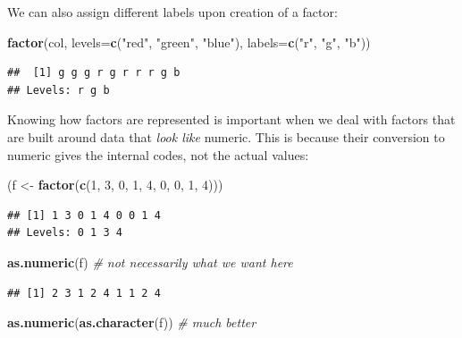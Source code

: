 \documentclass[10pt,b5paper,krantz1]{krantz}
\newenvironment{Shaded}{\begin{snugshade}}{\end{snugshade}}
\newcommand{\CommentTok}[1]{\textcolor[rgb]{0.37,0.37,0.37}{\textit{#1}}}
\newcommand{\DataTypeTok}[1]{\textcolor[rgb]{0.27,0.27,0.27}{#1}}
\newcommand{\DecValTok}[1]{\textcolor[rgb]{0.06,0.06,0.06}{#1}}
\newcommand{\KeywordTok}[1]{\textcolor[rgb]{0.27,0.27,0.27}{\textbf{#1}}}
\newcommand{\NormalTok}[1]{#1}
\newcommand{\StringTok}[1]{\textcolor[rgb]{0.5,0.5,0.5}{#1}}
\begin{document}
We can also assign different labels upon creation of a factor:

\begin{Shaded}
\begin{Highlighting}[]
\KeywordTok{factor}\NormalTok{(col, }\DataTypeTok{levels=}\KeywordTok{c}\NormalTok{(}\StringTok{"red"}\NormalTok{, }\StringTok{"green"}\NormalTok{, }\StringTok{"blue"}\NormalTok{), }\DataTypeTok{labels=}\KeywordTok{c}\NormalTok{(}\StringTok{"r"}\NormalTok{, }\StringTok{"g"}\NormalTok{, }\StringTok{"b"}\NormalTok{))}
\end{Highlighting}
\end{Shaded}

\begin{verbatim}
##  [1] g g g r g r r r g b
## Levels: r g b
\end{verbatim}

Knowing how factors are represented is important when we deal
with factors that are built around data that \emph{look like} numeric.
This is because their conversion to numeric
gives the internal codes, not the actual values:

\begin{Shaded}
\begin{Highlighting}[]
\NormalTok{(f <-}\StringTok{ }\KeywordTok{factor}\NormalTok{(}\KeywordTok{c}\NormalTok{(}\DecValTok{1}\NormalTok{, }\DecValTok{3}\NormalTok{, }\DecValTok{0}\NormalTok{, }\DecValTok{1}\NormalTok{, }\DecValTok{4}\NormalTok{, }\DecValTok{0}\NormalTok{, }\DecValTok{0}\NormalTok{, }\DecValTok{1}\NormalTok{, }\DecValTok{4}\NormalTok{)))}
\end{Highlighting}
\end{Shaded}

\begin{verbatim}
## [1] 1 3 0 1 4 0 0 1 4
## Levels: 0 1 3 4
\end{verbatim}

\begin{Shaded}
\begin{Highlighting}[]
\KeywordTok{as.numeric}\NormalTok{(f) }\CommentTok{# not necessarily what we want here}
\end{Highlighting}
\end{Shaded}

\begin{verbatim}
## [1] 2 3 1 2 4 1 1 2 4
\end{verbatim}

\begin{Shaded}
\begin{Highlighting}[]
\KeywordTok{as.numeric}\NormalTok{(}\KeywordTok{as.character}\NormalTok{(f)) }\CommentTok{# much better}
\end{Highlighting}
\end{Shaded}
\end{document}

